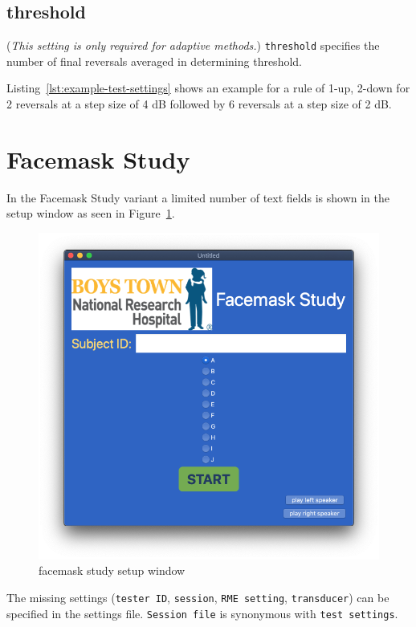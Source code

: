 \documentclass[11pt,pdftex,letterpaper]{article}
\begin{document}
\subsection{threshold}
(\textit{This setting is only required for adaptive methods.}) \texttt{threshold} specifies the number of final reversals averaged in determining threshold.

\vspace{\baselineskip}
Listing~\ref{lst:example-test-settings} shows an example for a rule of 1-up, 2-down for 2 reversals at a step size of 4 dB followed by 6 reversals at a step size of 2 dB.

\section{Facemask Study}
In the Facemask Study variant a limited number of text fields is shown in the setup window as seen in Figure~\ref{fig:facemask-study}.
\begin{figure}
	\centering
	\includegraphics[width = 0.9\linewidth]{facemask-study.png}
	\caption{facemask study setup window}
	\label{fig:facemask-study}
\end{figure}
The missing settings (\texttt{tester ID}, \texttt{session}, \texttt{RME setting}, \texttt{transducer}) can be specified in the settings file. \texttt{Session file} is synonymous with \texttt{test settings}.
\end{document}
